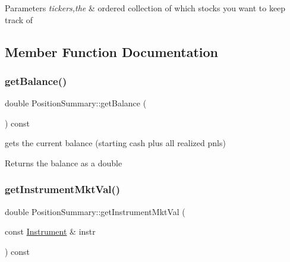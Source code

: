 \begin{DoxyParams}{Parameters}
{\em tickers,the} & ordered collection of which stocks you want to keep track of \\
\hline
\end{DoxyParams}


\subsection{Member Function Documentation}
\mbox{\label{classPositionSummary_a1c8772fe401f8d00de795ff09b856d44}} 
\subsubsection{\texorpdfstring{get\+Balance()}{getBalance()}}
{\footnotesize\ttfamily double Position\+Summary\+::get\+Balance (\begin{DoxyParamCaption}{ }\end{DoxyParamCaption}) const}



gets the current balance (starting cash plus all realized pnls) 

\begin{DoxyReturn}{Returns}
the balance as a double 
\end{DoxyReturn}
\mbox{\label{classPositionSummary_acb0534c73c95999d2ff2739caedf0773}} 
\subsubsection{\texorpdfstring{get\+Instrument\+Mkt\+Val()}{getInstrumentMktVal()}\hspace{0.1cm}{\footnotesize\ttfamily [1/2]}}
{\footnotesize\ttfamily double Position\+Summary\+::get\+Instrument\+Mkt\+Val (\begin{DoxyParamCaption}\item[{const \hyperlink{classInstrument}{Instrument} \&}]{instr }\end{DoxyParamCaption}) const}



